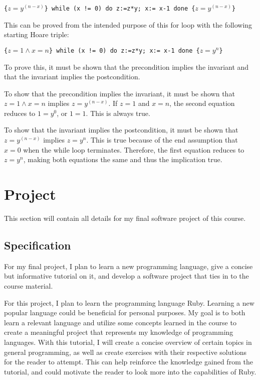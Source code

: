 \documentclass{article}
\theoremstyle{theorem}
\theoremstyle{definition}
\theoremstyle{remark}
\begin{document}
\texttt{\{$z = y^{(n - x)}$\}  while (x != 0) do z:=z*y;  x:= x-1 done  \{$z = y^{(n - x)}$\}}

This can be proved from the intended purpose of this for loop with the following starting Hoare triple:

\texttt{\{$z=1 \land x=n$\}  while (x != 0) do z:=z*y;  x:= x-1 done  \{$z = y^n$\}}

To prove this, it must be shown that the precondition implies the invariant and that the invariant implies the postcondition.

To show that the precondition implies the invariant, it must be shown that $z=1 \land x=n$ implies $z = y^{(n - x)}$. If $z=1$ and $x=n$, the second equation reduces to $1=y^0$, or $1=1$. This is always true.

To show that the invariant implies the postcondition, it must be shown that $z = y^{(n - x)}$ implies $z = y^n$. This is true because of the end assumption that $x=0$ when the while loop terminates. Therefore, the first equation reduces to $z = y^n$, making both equations the same and thus the implication true.

\newpage

\section{Project}\label{project}

This section will contain all details for my final software project of this course.

\subsection{Specification}

For my final project, I plan to learn a new programming language, give a concise but informative tutorial on it, and develop a software project that ties in to the course material. 

For this project, I plan to learn the programming language Ruby. Learning a new popular language could be beneficial for personal purposes. My goal is to both learn a relevant language and utilize some concepts learned in the course to create a meaningful project that represents my knowledge of programming languages. With this tutorial, I will create a concise overview of certain topics in general programming, as well as create exercises with their respective solutions for the reader to attempt. This can help reinforce the knowledge gained from the tutorial, and could motivate the reader to look more into the capabilities of Ruby.
\end{document}
